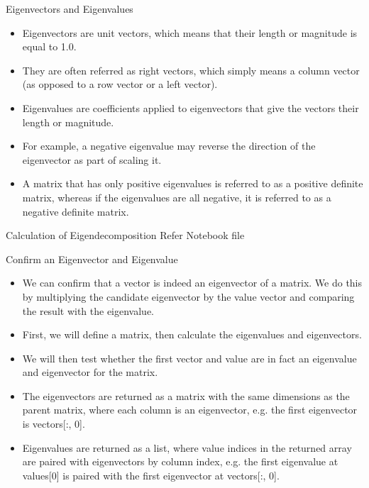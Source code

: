 \documentclass{beamer}
\begin{document}
\begin{frame}{Eigenvectors and Eigenvalues}
   \begin{itemize}
		\item Eigenvectors are unit vectors, which means that their length or magnitude is equal to 1.0.
		\item They
are often referred as right vectors, which simply means a column vector (as opposed to a row vector or a left vector).
		\item Eigenvalues are coefficients applied to eigenvectors that give the vectors their length or magnitude.
		\item For example, a negative eigenvalue may reverse the direction of the eigenvector as part of scaling it.
		\item A matrix that has only positive eigenvalues is referred to as a positive definite matrix, whereas if the eigenvalues are all negative, it is referred to as a negative definite matrix.
	\end{itemize}
\end{frame}

\begin{frame}{Calculation of Eigendecomposition}
	Refer Notebook file
\end{frame}
\begin{frame}{Confirm an Eigenvector and Eigenvalue}
\begin{itemize}
	\item We can confirm that a vector is indeed an eigenvector of a matrix. We do this by multiplying the candidate eigenvector by the value vector and comparing the result with the eigenvalue.
	\item First, we will define a matrix, then calculate the eigenvalues and eigenvectors.
	\item We will then test whether the first vector and value are in fact an eigenvalue and eigenvector for the matrix.
	\item The eigenvectors are returned as a matrix with the same dimensions as the parent matrix, where each column is an eigenvector, e.g. the first eigenvector is vectors[:, 0].
	\item Eigenvalues are returned as a list, where value indices in the returned array are paired with eigenvectors by column index, e.g. the first eigenvalue at values[0] is paired with the first eigenvector at vectors[:, 0].
\end{itemize}
\end{frame}
\end{document}

